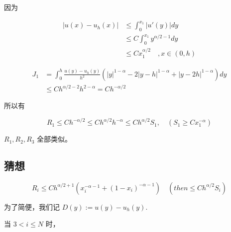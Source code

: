 \documentclass{ctexart}
\begin{document}
因为

\begin{equation}
    \begin{aligned}
        |u(x) - u_h(x)| & \le \int_0^{x_1} |u'(y)| dy                 \\
                        & \le C \int_0^{x_1} y^{\alpha/2-1} dy        \\
                        & \le C x_1^{\alpha/2}    \quad , x\in (0, h)
    \end{aligned}
\end{equation}


\begin{equation}
    \begin{aligned}
        J_1 & = \int_0^h \frac{ u(y) - u_h(y) }{h^2} (|y|^{1-\alpha} - 2|y-h|^{1-\alpha} + |y-2h|^{1-\alpha}) dy \\
            & \le C h^{\alpha/2-2} h^{2-\alpha} = C h^{-\alpha/2}
    \end{aligned}
\end{equation}

所以有

\begin{equation}
    R_1 \le C h^{-\alpha/2} \le C h^{\alpha/2} h^{-\alpha} \le C h^{\alpha/2} S_1, \quad (S_1\ge C x_1^{-\alpha})
\end{equation}


\(R_1, R_2, R_3\) 全部类似。

\subsection{猜想}

\begin{equation}
    R_i \le C h^{\alpha/2+1} (x_i^{-\alpha-1} + (1-x_i)^{-\alpha-1}) \quad (then \le C h^{\alpha/2} S_i)
\end{equation}

为了简便，我们记 \(D(y) := u(y) - u_h(y)\).

当 \(3<i\le N\) 时，
\end{document}
